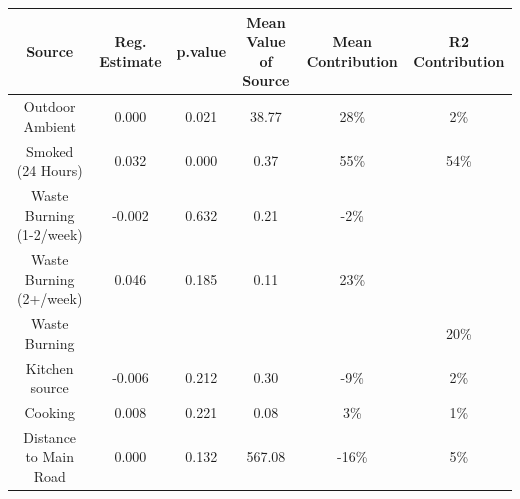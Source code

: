 \begin{table}
\centering
\begin{tabular}{cccccc}
\toprule
Source & Reg. Estimate & p.value & Mean Value of Source & Mean Contribution & R2 Contribution\\
\midrule
Outdoor Ambient & 0.000 & 0.021 & 38.77 & 28\% & 2\%\\
Smoked (24 Hours) & 0.032 & 0.000 & 0.37 & 55\% & 54\%\\
Waste Burning (1-2/week) & -0.002 & 0.632 & 0.21 & -2\% & \\
Waste Burning (2+/week) & 0.046 & 0.185 & 0.11 & 23\% & \\
Waste Burning &  &  &  &  & 20\%\\
\addlinespace
Kitchen source & -0.006 & 0.212 & 0.30 & -9\% & 2\%\\
Cooking & 0.008 & 0.221 & 0.08 & 3\% & 1\%\\
Distance to Main Road & 0.000 & 0.132 & 567.08 & -16\% & 5\%\\
\bottomrule
\end{tabular}
\end{table}
